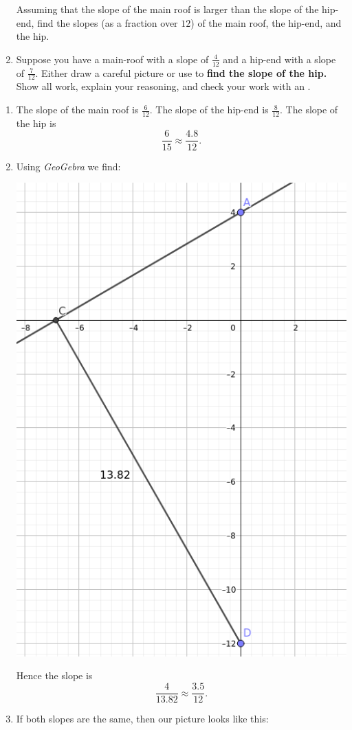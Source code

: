 \documentclass[hints,nooutcomes,noauthor,handout]{ximera}
\begin{document}
\begin{question}
\begin{enumerate}
\begin{center}
    \end{center}
    Assuming that the slope of the main roof is larger than the slope
    of the hip-end, find the slopes (as a fraction over $12$) of the main roof, the hip-end, and
    the hip. 
  \item Suppose you have a main-roof with a slope of $\frac{4}{12}$
    and a hip-end with a slope of $\frac{7}{12}$. Either draw a
    careful picture or use
     to
    \textbf{find the slope of the hip.}  Show all work, explain your
    reasoning, and check your work with an .

  \end{enumerate}
  \begin{freeResponse}
    \begin{enumerate}
    \item The slope of the main roof is $\frac{6}{12}$. The slope of
      the hip-end is $\frac{8}{12}$. The slope of the hip is
      \[
      \frac{6}{15} \approx \frac{4.8}{12}.
      \]
    \item Using \textit{GeoGebra} we find:
      \begin{center}
        \includegraphics[width=.3\textwidth]{workUnEqSlope.png}
      \end{center}
      Hence the slope is
      \[
      \frac{4}{13.82} \approx \frac{3.5}{12}.
      \]
    \item If both slopes are the same, then our picture looks like
      this:
      \begin{center}
        \begin{tikzpicture}[geometryDiagrams,scale=.2]


\end{tikzpicture}
\end{center}
\end{enumerate}
\end{freeResponse}
\end{question}
\end{document}
